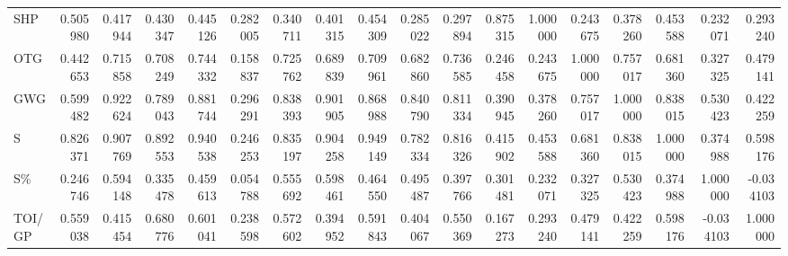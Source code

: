 \begin{tabular}{lrrrrrrrrrrrrrrrrr}
SHP & 0.505980 & 0.417944 & 0.430347 & 0.445126 & 0.282005 & 0.340711 & 0.401315 & 0.454309 & 0.285022 & 0.297894 & 0.875315 & 1.000000 & 0.243675 & 0.378260 & 0.453588 & 0.232071 & 0.293240 \\
OTG & 0.442653 & 0.715858 & 0.708249 & 0.744332 & 0.158837 & 0.725762 & 0.689839 & 0.709961 & 0.682860 & 0.736585 & 0.246458 & 0.243675 & 1.000000 & 0.757017 & 0.681360 & 0.327325 & 0.479141 \\
GWG & 0.599482 & 0.922624 & 0.789043 & 0.881744 & 0.296291 & 0.838393 & 0.901905 & 0.868988 & 0.840790 & 0.811334 & 0.390945 & 0.378260 & 0.757017 & 1.000000 & 0.838015 & 0.530423 & 0.422259 \\
S & 0.826371 & 0.907769 & 0.892553 & 0.940538 & 0.246253 & 0.835197 & 0.904258 & 0.949149 & 0.782334 & 0.816326 & 0.415902 & 0.453588 & 0.681360 & 0.838015 & 1.000000 & 0.374988 & 0.598176 \\
S\% & 0.246746 & 0.594148 & 0.335478 & 0.459613 & 0.054788 & 0.555692 & 0.598461 & 0.464550 & 0.495487 & 0.397766 & 0.301481 & 0.232071 & 0.327325 & 0.530423 & 0.374988 & 1.000000 & -0.034103 \\
TOI/GP & 0.559038 & 0.415454 & 0.680776 & 0.601041 & 0.238598 & 0.572602 & 0.394952 & 0.591843 & 0.404067 & 0.550369 & 0.167273 & 0.293240 & 0.479141 & 0.422259 & 0.598176 & -0.034103 & 1.000000 \\
\bottomrule
\end{tabular}

